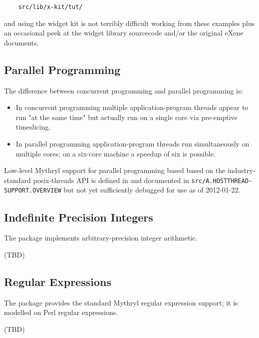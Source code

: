 \begin{verbatim}
    src/lib/x-kit/tut/
\end{verbatim}

and using the widget kit is not terribly difficult working from these examples plus 
an occasional peek at the widget library sourcecode and/or the original eXene documents. 



\cutend*

\subsection{Parallel Programming}
\label{section:tut:topic:parallel-programming}

The difference between concurrent programming and parallel programming is: 
\begin{itemize}

\item 
In concurrent programming multiple application-program threads appear to run 
"at the same time" but actually run on a single core via pre-emptive timeslicing. 

\item 
In parallel programming application-program threads run simultaneously on 
multiple cores;  on a six-core machine a speedup of six is possible. 
\end{itemize}

Low-level Mythryl support for parallel programming based 
based on the industry-standard posix-threads API is defined in 
 and 
documented in {\tt src/A.HOSTTHREAD-SUPPORT.OVERVIEW} but not yet sufficiently 
debugged for use as of 2012-01-22. 

\cutend*

\subsection{Indefinite Precision Integers}
\label{section:tut:topic:integer}

The  package implements arbitrary-precision integer 
arithmetic.

(TBD)

\cutend*

\subsection{Regular Expressions}
\label{section:tut:topic:regex}

The  package provides the standard Mythryl 
regular expression support;  it is modelled on Perl regular expressions.

(TBD)

\cutend*


